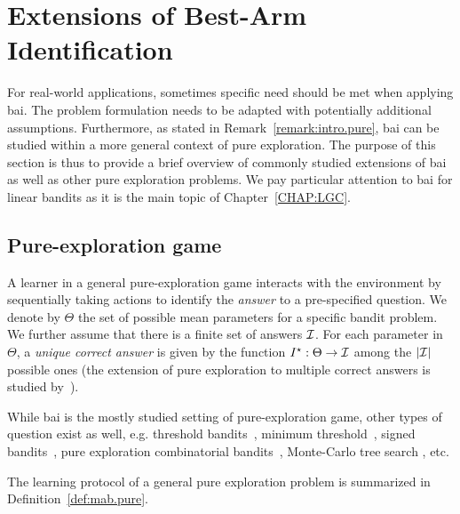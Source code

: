 \section{Extensions of Best-Arm Identification}\label{sec:mab.extensions}

For real-world applications, sometimes specific need should be met when applying \gls{bai}. The problem formulation needs to be adapted with potentially additional assumptions. Furthermore, as stated in Remark~\ref{remark:intro.pure}, \gls{bai} can be studied within a more general context of pure exploration. The purpose of this section is thus to provide a brief overview of commonly studied extensions of \gls{bai} as well as other pure exploration problems. We pay particular attention to \gls{bai} for linear bandits as it is the main topic of Chapter~\ref{CHAP:LGC}.

\subsection{Pure-exploration game}\label{sec:mab.extensions.pure}

A learner in a general pure-exploration game interacts with the environment by sequentially taking actions to identify the \emph{answer} to a pre-specified question. We denote by $\Theta$ the set of possible mean parameters for a specific bandit problem. We further assume that there is a finite set of answers $\mathcal{I}$. For each parameter in $\Theta$, a \emph{unique correct answer} is given by the function $I^\star:\Theta \to \mathcal{I}$ among the $|\mathcal{I}|$ possible ones (the extension of pure exploration to multiple correct answers is studied by~\citealt{degenne2019pure}).

While \gls{bai} is the mostly studied setting of pure-exploration game, other types of question exist as well, e.g. threshold bandits~\citep{locatelli2016thresholding}, minimum threshold~\citep{kaufmann2018murphy}, signed bandits~\citep{menard2019lma}, pure exploration combinatorial bandits~\citep{chen2014combinatorial}, Monte-Carlo tree search \citep{teraoka2014mc}, etc.

The learning protocol of a general pure exploration problem is summarized in Definition~\ref{def:mab.pure}.

